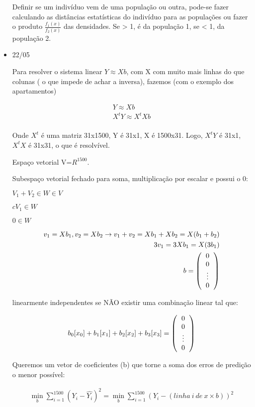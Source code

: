 \documentclass[11pt,a4paper]{book}
\DeclareMathOperator*{\mini}{min}
\begin{document}
\begin{itemize}
		 Definir se um indivíduo vem de uma população ou outra, pode-se fazer calculando as distâncias estatísticas do indivíduo para as populações ou fazer o produto $\frac{f_1(x)}{f_2(x)}$ das densidades.
		 Se > 1, é da população 1, se <  1, da população 2.
		 
		 \item
		 22/05
		 
		 Para resolver o sistema linear $Y\approx Xb$, com X com muito mais linhas do que colunas ( o que impede de achar a inversa), fazemos (com o exemplo dos apartamentos)
		 
		 \begin{eqnarray*}
		 	Y\approx Xb\\
		 	X^t Y\approx X^t Xb\\
		 \end{eqnarray*}
		 
		 Onde $X^t$ é uma matriz 31x1500, Y é 31x1, X é 1500x31.
		 Logo, $X^t Y$ é 31x1, $X^t X$ é 31x31, o que é resolvível.
		 
		 
		 Espaço vetorial V=$R^1500$.
		 
		 Subespaço vetorial
		 fechado para soma, multiplicação por escalar e possui o 0:
		 
		 $V_1+V_2\in W \in V$
		 
		 $cV_1\in W$
		 
		 $0 \in W$
		 
		 \begin{eqnarray*}
		 	v_1=Xb_1, v_2=Xb_2 \rightarrow v_1+v_2=Xb_1+Xb_2=X(b_1+b_2)\\		 
		 	3v_1=3Xb_1=X(3b_1)\\
		 	b=\left(
		 	\begin{tabular}{c}
		 	0\\
		 	0\\
		 	\vdots\\
		 	0
		 	\end{tabular}
		 	\right)
		 \end{eqnarray*}
		 
		 linearmente independentes se NÃO existir uma combinação linear tal que:
		 
		 \begin{eqnarray*}
		 	b_0[x_0]+b_1[x_1]+b_2[x_2]+b_3[x_3]=\left(
		 	\begin{tabular}{c}
		 	0\\
		 	0\\
		 	\vdots\\
		 	0
		 	\end{tabular}
		 	\right)
		 \end{eqnarray*}
		
		Queremos um vetor de coeficientes (b) que torne a soma dos erros de predição o menor possível:
		
		\begin{eqnarray*}
			\mini_{b}\sum_{i=1}^{1500}(Y_i-\hat{Y_i})^2=\mini_b\sum_{i=1}^{1500}(Y_i-(linha~i~de~x\times b))^2
		\end{eqnarray*}
	\end{itemize}
\end{document}
